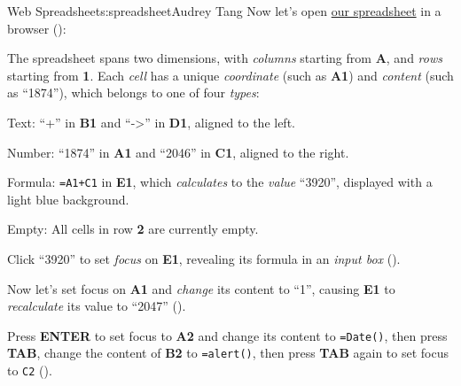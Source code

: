 \begin{aosachapter}{Web Spreadsheet}{s:spreadsheet}{Audrey Tang}
Now let's open \href{http://audreyt.github.io/500lines/spreadsheet/}{our
spreadsheet} in a browser ():


\label{basic-concepts}

The spreadsheet spans two dimensions, with \emph{columns} starting from
\textbf{A}, and \emph{rows} starting from \textbf{1}. Each \emph{cell}
has a unique \emph{coordinate} (such as \textbf{A1}) and \emph{content}
(such as ``1874''), which belongs to one of four \emph{types}:

\begin{aosaitemize}

\item
  Text: ``+'' in \textbf{B1} and ``-\textgreater{}'' in \textbf{D1},
  aligned to the left.
\item
  Number: ``1874'' in \textbf{A1} and ``2046'' in \textbf{C1}, aligned
  to the right.
\item
  Formula: \texttt{=A1+C1} in \textbf{E1}, which \emph{calculates} to
  the \emph{value} ``3920'', displayed with a light blue background.
\item
  Empty: All cells in row \textbf{2} are currently empty.
\end{aosaitemize}

Click ``3920'' to set \emph{focus} on \textbf{E1}, revealing its formula
in an \emph{input box} ().


Now let's set focus on \textbf{A1} and \emph{change} its content to
``1'', causing \textbf{E1} to \emph{recalculate} its value to ``2047''
().


Press \textbf{ENTER} to set focus to \textbf{A2} and change its content
to \texttt{=Date()}, then press \textbf{TAB}, change the content of
\textbf{B2} to \texttt{=alert()}, then press \textbf{TAB} again to set
focus to \texttt{C2} ().



\end{aosachapter}
